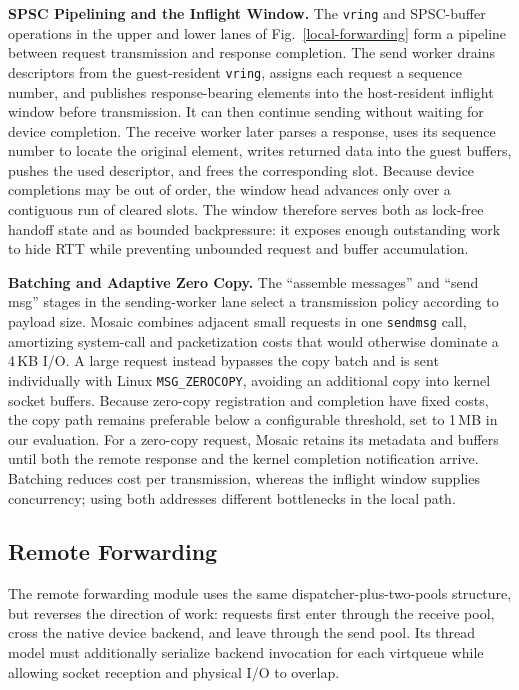 \documentclass[sigplan,10pt]{acmart}
\begin{document}
\textbf{SPSC Pipelining and the Inflight Window.} The \texttt{vring} and SPSC-buffer operations in the upper and lower lanes of Fig.~\ref{local-forwarding} form a pipeline between request transmission and response completion. The send worker drains descriptors from the guest-resident \texttt{vring}, assigns each request a sequence number, and publishes response-bearing elements into the host-resident inflight window before transmission. It can then continue sending without waiting for device completion. The receive worker later parses a response, uses its sequence number to locate the original element, writes returned data into the guest buffers, pushes the used descriptor, and frees the corresponding slot. Because device completions may be out of order, the window head advances only over a contiguous run of cleared slots. The window therefore serves both as lock-free handoff state and as bounded backpressure: it exposes enough outstanding work to hide RTT while preventing unbounded request and buffer accumulation.

\textbf{Batching and Adaptive Zero Copy.} The ``assemble messages'' and ``send msg'' stages in the sending-worker lane select a transmission policy according to payload size. Mosaic combines adjacent small requests in one \texttt{sendmsg} call, amortizing system-call and packetization costs that would otherwise dominate a 4\,KB I/O. A large request instead bypasses the copy batch and is sent individually with Linux \texttt{MSG\_ZEROCOPY}, avoiding an additional copy into kernel socket buffers. Because zero-copy registration and completion have fixed costs, the copy path remains preferable below a configurable threshold, set to 1\,MB in our evaluation. For a zero-copy request, Mosaic retains its metadata and buffers until both the remote response and the kernel completion notification arrive. Batching reduces cost per transmission, whereas the inflight window supplies concurrency; using both addresses different bottlenecks in the local path.

\subsection{Remote Forwarding}
The remote forwarding module uses the same dispatcher-plus-two-pools structure, but reverses the direction of work: requests first enter through the receive pool, cross the native device backend, and leave through the send pool. Its thread model must additionally serialize backend invocation for each virtqueue while allowing socket reception and physical I/O to overlap.
\end{document}
